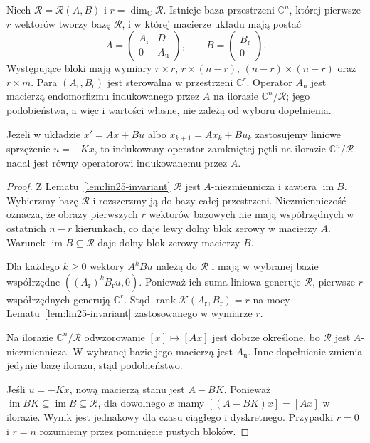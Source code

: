\begin{twierdzenie}
\label{thm:lin25-reachable-split}
Niech
\(\mathcal R=\mathcal R(A,B)\)
i \(r=\dim_{\mathbb C}\mathcal R\).
Istnieje baza przestrzeni
\(\mathbb C^n\), której pierwsze
\(r\) wektorów tworzy bazę
\(\mathcal R\), i w której
macierze układu mają postać
\[
 A=\begin{pmatrix}
 A_{\mathrm r}&D\\0&A_{\mathrm u}
 \end{pmatrix},
 \qquad
 B=\begin{pmatrix}B_{\mathrm r}\\0\end{pmatrix}.
\]
Występujące bloki mają wymiary
\(r\times r\), \(r\times(n-r)\),
\((n-r)\times(n-r)\)
oraz \(r\times m\).
Para \((A_{\mathrm r},B_{\mathrm r})\)
jest sterowalna
w przestrzeni \(\mathbb C^r\).
Operator \(A_{\mathrm u}\)
jest macierzą endomorfizmu
indukowanego przez \(A\)
na ilorazie
\(\mathbb C^n/\mathcal R\);
jego podobieństwa, a więc
i wartości własne, nie zależą
od wyboru dopełnienia.

Jeżeli w układzie
\(x'=Ax+Bu\) albo
\(x_{k+1}=Ax_k+Bu_k\)
zastosujemy liniowe
sprzężenie \(u=-Kx\),
to indukowany operator
zamkniętej pętli na ilorazie
\(\mathbb C^n/\mathcal R\)
nadal jest równy
operatorowi indukowanemu
przez \(A\).
\end{twierdzenie}
\begin{proof}
Z
Lematu~\ref{lem:lin25-invariant}
\(\mathcal R\) jest
\(A\)-niezmiennicza
i zawiera \(\operatorname{im}B\).
Wybierzmy bazę \(\mathcal R\)
i rozszerzmy ją do bazy
całej przestrzeni.
Niezmienniczość
oznacza, że obrazy pierwszych
\(r\) wektorów bazowych
nie mają współrzędnych
w ostatnich \(n-r\) kierunkach,
co daje lewy dolny blok
zerowy w macierzy \(A\).
Warunek
\(\operatorname{im}B\subseteq\mathcal R\)
daje dolny blok zerowy macierzy \(B\).

Dla każdego \(k\ge0\)
wektory \(A^kBu\) należą
do \(\mathcal R\) i mają
w wybranej bazie współrzędne
\(((A_{\mathrm r})^kB_{\mathrm r}u,0)\).
Ponieważ ich suma liniowa
generuje \(\mathcal R\),
pierwsze \(r\) współrzędnych
generują \(\mathbb C^r\).
Stąd
\(\operatorname{rank}
 \mathcal K(A_{\mathrm r},B_{\mathrm r})=r\)
na mocy
Lematu~\ref{lem:lin25-invariant}
zastosowanego w wymiarze \(r\).

Na ilorazie
\(\mathbb C^n/\mathcal R\)
odwzorowanie
\([x]\mapsto[Ax]\)
jest dobrze określone,
bo \(\mathcal R\)
jest \(A\)-niezmiennicza.
W wybranej bazie
jego macierzą jest
\(A_{\mathrm u}\).
Inne dopełnienie zmienia
jedynie bazę ilorazu,
stąd podobieństwo.

Jeśli \(u=-Kx\),
nową macierzą stanu
jest \(A-BK\).
Ponieważ \(\operatorname{im}BK
 \subseteq\operatorname{im}B
 \subseteq\mathcal R\),
dla dowolnego \(x\)
mamy
\([(A-BK)x]=[Ax]\)
w ilorazie.
Wynik jest jednakowy
dla czasu ciągłego
i dyskretnego.
Przypadki \(r=0\) i \(r=n\)
rozumiemy przez pominięcie
pustych bloków.
\end{proof}

